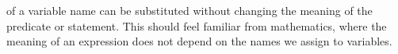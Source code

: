 of a variable name can be substituted without
changing the meaning of the predicate or statement. This should feel familiar from mathematics,
where the meaning of an expression does not depend on the names we assign to variables.
